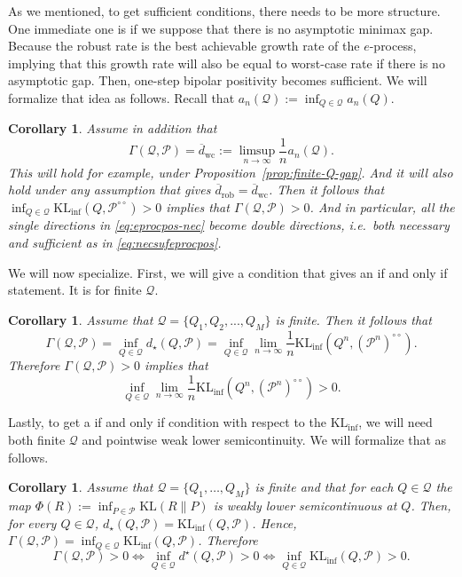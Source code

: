 \documentclass[11pt]{article}
\newcommand{\KL}{\mathrm{KL}}
\newcommand{\KLinf}{\mathrm{KL}_{\mathrm{inf}}}
\newcommand{\Pcal}{\mathcal{P}}
\newcommand{\Qcal}{\mathcal{Q}}
\newtheorem{corollary}[theorem]{Corollary}
\theoremstyle{definition}
\theoremstyle{definition}
\begin{document}
As we mentioned, to get sufficient conditions, there needs to be more structure. One immediate one is if we suppose that there is no asymptotic minimax gap. Because the robust rate is the best achievable growth rate of the $e$-process, implying that this growth rate will also be equal to worst-case rate if there is no asymptotic gap. Then, one-step bipolar positivity becomes sufficient. We will formalize that idea as follows. Recall that $a_n(\Qcal):=\inf_{Q\in\Qcal}a_n(Q)$.

\begin{corollary}\label{cor:bipolar-one-step-positive}
Assume in addition that
\[
\Gamma(\Qcal,\Pcal)=\overline d_{\mathrm{wc}}:=\limsup_{n\to\infty}\frac1n a_n(\Qcal).
\]
This will hold for example, under Proposition~\ref{prop:finite-Q-gap}. And it will also hold under any assumption that gives $\overline d_{\mathrm{rob}}=\overline d_{\mathrm{wc}}$. 
Then it follows that $\inf_{Q\in\Qcal}\KLinf(Q,\Pcal^{{\circ}{\circ}})>0$ implies that $\Gamma(\Qcal,\Pcal)>0$. And in particular, all the single directions in \eqref{eq:eprocpos-nec} become double directions, i.e.\ both necessary and sufficient as in \eqref{eq:necsufeprocpos}.
\end{corollary}

We will now specialize. First, we will give a condition that gives an if and only if statement. It is for finite $\Qcal$.

\begin{corollary}\label{cor:gamma-positive-finiteQ}
Assume that $\Qcal=\{Q_1,Q_2,...,Q_M\}$ is finite. Then it follows that
\[
\Gamma(\Qcal,\Pcal)=\inf_{Q\in\Qcal}d_{\star}(Q,\Pcal)=\inf_{Q\in\Qcal}\lim_{n\to\infty}\frac1n \KLinf(Q^n, (\Pcal^n)^{{\circ}{\circ}}).
\]
Therefore $\Gamma(\Qcal,\Pcal)>0$ implies that
\[
\inf_{Q\in\Qcal}\lim_{n\to\infty}\frac1n \KLinf(Q^n,(\Pcal^n)^{{\circ}{\circ}})>0.
\]
\end{corollary}

Lastly, to get a if and only if condition with respect to the $\KLinf$, we will need both finite $\Qcal$ and pointwise weak lower semicontinuity. We will formalize that as follows.

\begin{corollary}\label{cor:gamma-positive-finiteQ-wlsc}
Assume that $\Qcal=\{Q_1,\dots,Q_M\}$ is finite and that for each $Q\in\Qcal$ the map $\Phi(R):=\inf_{P\in\Pcal}\KL(R\|P)$ is weakly lower semicontinuous at $Q$. Then, for every $Q\in\Qcal$, $d_{\star}(Q,\Pcal)=\KLinf(Q,\Pcal)$. Hence, $\Gamma(\Qcal,\Pcal)=\inf_{Q\in\Qcal}\KLinf(Q,\Pcal)$. Therefore
\[
\boxed{
\Gamma(\Qcal,\Pcal)>0\Longleftrightarrow \inf_{Q\in\Qcal}d^{\star}(Q,\Pcal)>0 \Longleftrightarrow \inf_{Q\in\Qcal}\KLinf(Q,\Pcal)>0.
}
\]
\end{corollary}
\end{document}
